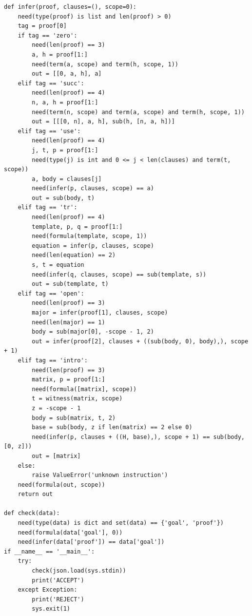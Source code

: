 \documentclass[11pt,letterpaper]{article}
\theoremstyle{definition}\newtheorem{definition}[theorem]{Definition}
\theoremstyle{remark}\newtheorem{remark}[theorem]{Remark}
\begin{document}
\begin{lstlisting}
def infer(proof, clauses=(), scope=0):
    need(type(proof) is list and len(proof) > 0)
    tag = proof[0]
    if tag == 'zero':
        need(len(proof) == 3)
        a, h = proof[1:]
        need(term(a, scope) and term(h, scope, 1))
        out = [[0, a, h], a]
    elif tag == 'succ':
        need(len(proof) == 4)
        n, a, h = proof[1:]
        need(term(n, scope) and term(a, scope) and term(h, scope, 1))
        out = [[[0, n], a, h], sub(h, [n, a, h])]
    elif tag == 'use':
        need(len(proof) == 4)
        j, t, p = proof[1:]
        need(type(j) is int and 0 <= j < len(clauses) and term(t, scope))
        a, body = clauses[j]
        need(infer(p, clauses, scope) == a)
        out = sub(body, t)
    elif tag == 'tr':
        need(len(proof) == 4)
        template, p, q = proof[1:]
        need(formula(template, scope, 1))
        equation = infer(p, clauses, scope)
        need(len(equation) == 2)
        s, t = equation
        need(infer(q, clauses, scope) == sub(template, s))
        out = sub(template, t)
    elif tag == 'open':
        need(len(proof) == 3)
        major = infer(proof[1], clauses, scope)
        need(len(major) == 1)
        body = sub(major[0], -scope - 1, 2)
        out = infer(proof[2], clauses + ((sub(body, 0), body),), scope + 1)
    elif tag == 'intro':
        need(len(proof) == 3)
        matrix, p = proof[1:]
        need(formula([matrix], scope))
        t = witness(matrix, scope)
        z = -scope - 1
        body = sub(matrix, t, 2)
        base = sub(body, z if len(matrix) == 2 else 0)
        need(infer(p, clauses + ((H, base),), scope + 1) == sub(body, [0, z]))
        out = [matrix]
    else:
        raise ValueError('unknown instruction')
    need(formula(out, scope))
    return out

def check(data):
    need(type(data) is dict and set(data) == {'goal', 'proof'})
    need(formula(data['goal'], 0))
    need(infer(data['proof']) == data['goal'])
if __name__ == '__main__':
    try:
        check(json.load(sys.stdin))
        print('ACCEPT')
    except Exception:
        print('REJECT')
        sys.exit(1)
\end{lstlisting}
\clearpage
\end{document}
